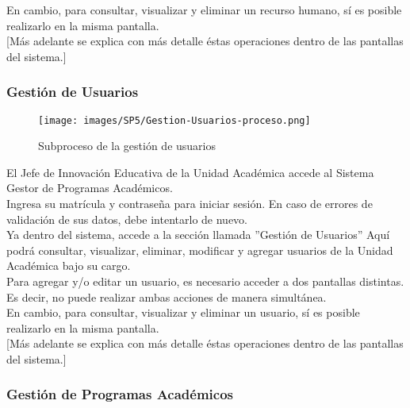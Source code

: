         En cambio, para consultar, visualizar y eliminar un recurso humano, sí es posible realizarlo en la misma pantalla.\\
        
        [Más adelante se explica con más detalle éstas operaciones dentro de las pantallas del sistema.]\\
		
		
		\subsubsection{Gestión de Usuarios}
    	
        \begin{figure}[!hbtp]
        	\centering
        	\hypertarget{BPMNGRH}{\texttt{[image: images/SP5/Gestion-Usuarios-proceso.png]}}
        	\caption{Subproceso de la gestión de usuarios}
        	\label{BPMNGRH}
        \end{figure}
        
        El Jefe de Innovación Educativa de la Unidad Académica accede al Sistema Gestor de Programas Académicos.\\
        
        Ingresa su matrícula y contraseña para iniciar sesión. En caso de errores de validación de sus datos, debe intentarlo de nuevo.\\
        
        Ya dentro del sistema, accede a la sección llamada ''Gestión de Usuarios'' Aquí podrá consultar, visualizar, eliminar, modificar y agregar usuarios de la Unidad Académica bajo su cargo. \\
        
        Para agregar y/o editar un usuario, es necesario acceder a dos pantallas distintas. Es decir, no puede realizar ambas acciones de manera simultánea.\\
        
        En cambio, para consultar, visualizar y eliminar un usuario, sí es posible realizarlo en la misma pantalla.\\
        
        [Más adelante se explica con más detalle éstas operaciones dentro de las pantallas del sistema.]\\
        
		
        \subsubsection{Gestión de Programas Académicos}
        
